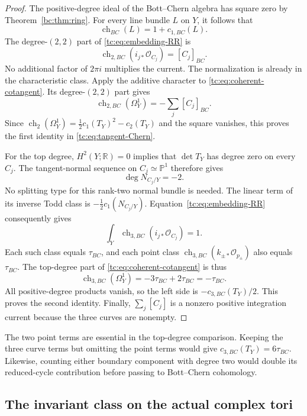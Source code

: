 \begin{proof}
The positive-degree ideal of the Bott--Chern algebra has square
zero by Theorem~\ref{bc:thm:ring}.
For every line bundle $L$ on $Y$, it follows that
\[
                     \operatorname{ch}_{BC}(L)=1+c_{1,BC}(L).
\]
The degree-$(2,2)$ part of \eqref{tc:eq:embedding-RR} is
\[
                \operatorname{ch}_{2,BC}(i_{j*}\mathcal O_{C_j})
                                   =[C_j]_{BC}.
\]
No additional factor of $2\pi i$ multiplies the current.
The normalization is already in the characteristic class.
Apply the additive character to \eqref{tc:eq:coherent-cotangent}.
Its degree-$(2,2)$ part gives
\[
 \operatorname{ch}_{2,BC}(\Omega_Y^1)
                         =-\sum_j[C_j]_{BC}.
\]
Since
$\operatorname{ch}_2(\Omega_Y^1)
=\tfrac12c_1(T_Y)^2-c_2(T_Y)$ and the square vanishes,
this proves the first identity in \eqref{tc:eq:tangent-Chern}.

For the top degree, $H^2(Y;\mathbb R)=0$ implies that
$\det T_Y$ has degree zero on every $C_j$.
The tangent-normal sequence on $C_j\simeq\mathbb P^1$ therefore
gives
\[
                     \deg N_{C_j/Y}=-2.
\]
No splitting type for this rank-two normal bundle is needed.
The linear term of its inverse Todd class is
$-\tfrac12c_1(N_{C_j/Y})$.
Equation~\eqref{tc:eq:embedding-RR} consequently gives
\[
 \int_Y\operatorname{ch}_{3,BC}(i_{j*}\mathcal O_{C_j})=1.
\]
Each such class equals $\tau_{BC}$, and each point class
$\operatorname{ch}_{3,BC}(k_{\pm*}\mathcal O_{p_\pm})$
also equals $\tau_{BC}$.
The top-degree part of \eqref{tc:eq:coherent-cotangent} is thus
\[
             \operatorname{ch}_{3,BC}(\Omega_Y^1)
                              =-3\tau_{BC}+2\tau_{BC}=-\tau_{BC}.
\]
All positive-degree products vanish, so the left side is
$-c_{3,BC}(T_Y)/2$. This proves the second identity.
Finally, $\sum_j[C_j]$ is a nonzero positive integration current
because the three curves are nonempty.
\end{proof}

The two point terms are essential in the top-degree comparison.
Keeping the three curve terms but omitting the point terms would
give $c_{3,BC}(T_Y)=6\tau_{BC}$.
Likewise, counting either boundary component with degree two
would double its reduced-cycle contribution before passing to
Bott--Chern cohomology.

\subsection{The invariant class on the actual complex tori}

